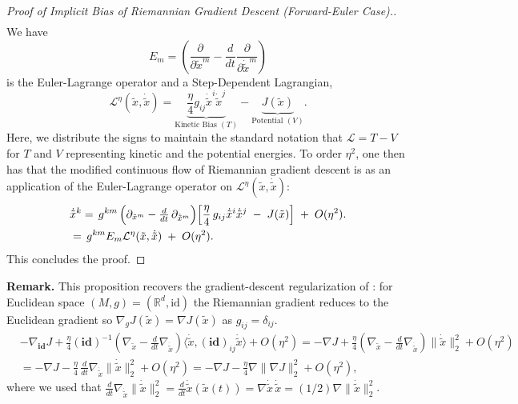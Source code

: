 \documentclass[reqno,11pt,letterpaper]{amsart}
\theoremstyle{plain}
\theoremstyle{definition}
\theoremstyle{remark}
\newcommand{\rgrad}{\nabla_{\!g}}
\newcommand{\mb}{\mathbf}
\begin{document}
\begin{proof}[Proof of Implicit Bias of Riemannian Gradient Descent (Forward-Euler Case).]
\begin{align*}
\end{align*}
We have 
\[
E_{m} = \left( 
    \frac{\partial}{\partial \tilde{x}^{m}} 
    -    \frac{d}{dt} \frac{\partial}{\partial \Dot{\tilde{x}}^{m}}  \right)
\]
is the Euler-Lagrange operator and a Step-Dependent Lagrangian,
\[
\mathcal{L}^{\eta}(\tilde{x}, \dot{\tilde{x}}) =  \underbrace{\frac{\eta}{4} g_{ij} \Dot{\tilde{x}}^{i} \Dot{\tilde{x}}^{j}}_{\textrm{Kinetic Bias }(T)} - \underbrace{J(\tilde{x})}_{\textrm{Potential }(V) 
}. 
\]
Here, we distribute the signs to maintain the standard notation that $\mathcal{L} = T - V$ for $T$ and $V$ representing kinetic and the potential energies. To order $\eta^{2}$, one then has that the modified continuous flow of Riemannian gradient descent is as an application of the Euler-Lagrange operator on $\mathcal{L}^{\eta}(\tilde{x}, \dot{\tilde{x}})$:
\begin{align*}
&\Dot{\tilde{x}}^{k} = \,g^{km}\,\Bigl(
\partial_{\tilde{x}^{m}}
-\tfrac{d}{dt}\,\partial_{\dot{\tilde{x}}^{m}}
\Bigr)
\Bigl[\frac{\eta}{4}\,g_{ij}\dot{\tilde{x}}^{i}\dot{\tilde{x}}^{j}\;-\;
J(\tilde{x})
\Bigr]
\;+\;O(\eta^{2}). \\
& = \,g^{km}E_{m}\mathcal{L}^{\eta}(\tilde{x}, \dot{\tilde{x}})\;+\;O(\eta^{2}).
\end{align*}
This concludes the proof.
\end{proof}

\textbf{Remark.}
This proposition recovers the gradient-descent regularization of \cite{smith2021on, barrett2021implicit}: for Euclidean space $(M, g) = (\mathbb{R}^{d}, \mathrm{id})$ the Riemannian gradient reduces to the Euclidean gradient so $\rgrad J (\tilde{x} ) =  \nabla J(\tilde{x})$ as $g_{ij} = \delta_{ij}$. 
\begin{align*}
    &- \nabla_{\mb{id}} J + \frac{\eta}{4}  (\mb{id})^{-1}\left( 
    \nabla_{\tilde{x}} - \frac{d}{dt} \nabla_{\Dot{\tilde{x}}}
    \right) \langle \dot{\tilde{x}}, (\mb{id})_{ij} \dot{\tilde{x}} \rangle + O(\eta^{2}) = - \nabla J + \frac{\eta}{4} \left( 
    \nabla_{\tilde{x}} - \frac{d}{dt} \nabla_{\Dot{\tilde{x}}}
    \right) \lVert \dot{\tilde{x}} \rVert_{2}^{2} + O(\eta^{2}) \\
    &= - \nabla J - \frac{\eta}{4}  
     \,\frac{d}{dt} \nabla_{\Dot{\tilde{x}}}\lVert \dot{\tilde{x}} \rVert_{2}^{2} + O(\eta^{2}) = - \nabla J - \frac{\eta}{4}  \nabla \lVert \nabla J \rVert_{2}^{2} + O(\eta^{2}),
\end{align*}
where we used that $\frac{d}{dt} \nabla_{\Dot{\tilde{x}}}\lVert \dot{\tilde{x}} \rVert_{2}^{2} = \frac{d}{dt} \dot{\tilde{x}}(\tilde{x}(t)) = \nabla \dot{\tilde{x}} \,\dot{\tilde{x}} = (1/2)\nabla \lVert \dot{\tilde{x}} \rVert_{2}^{2}$.
\end{document}

